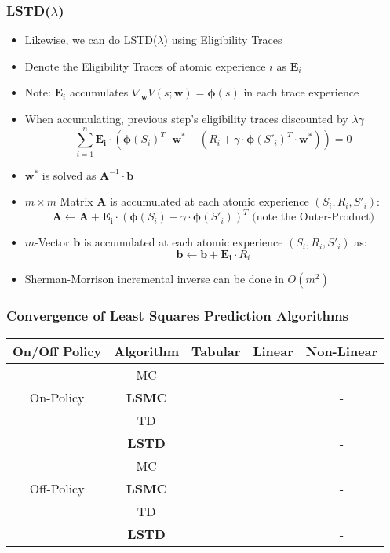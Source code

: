 \documentclass[handout]{beamer}
\newcommand{\cmark}{\ding{51}}%
\newcommand{\xmark}{\ding{55}}%
\begin{document}
\begin{frame}
\frametitle{LSTD($\lambda$)}
\pause
\begin{itemize}[<+->]
\item Likewise, we can do LSTD($\lambda$) using Eligibility Traces
\item Denote the Eligibility Traces of atomic experience $i$ as $\bm{E}_i$
\item Note: $\bm{E}_i$ accumulates $\nabla_{\bm{w}} V(s;\bm{w}) = \bm{\phi}(s)$ in each trace experience
\item When accumulating, previous step's eligibility traces discounted by $\lambda \gamma$
$$\sum_{i=1}^n \bm{E_i} \cdot (\bm{\phi}(S_i)^T \cdot \bm{w^*} - (R_i + \gamma \cdot \bm{\phi}(S'_i)^T \cdot \bm{w}^*)) = 0$$
\item $\bm{w}^*$ is solved as $\bm{A}^{-1} \cdot \bm{b}$
\item $m \times m$ Matrix $\bm{A}$ is accumulated at each atomic experience $(S_i, R_i, S'_i)$:
$$ \bm{A} \leftarrow \bm{A} + \bm{E_i} \cdot (\bm{\phi}(S_i) - \gamma \cdot \bm{\phi}(S'_i))^T \text{ (note the Outer-Product)}$$
\item $m$-Vector $\bm{b}$ is accumulated at each atomic experience $(S_i, R_i, S'_i)$ as:
$$\bm{b} \leftarrow \bm{b} + \bm{E_i} \cdot R_i$$
\item Sherman-Morrison incremental inverse can be done in $O(m^2)$
\end{itemize}
\end{frame}

\begin{frame}
\frametitle{Convergence of Least Squares Prediction Algorithms}
\pause
\begin{center}
      \begin{tabular}{ccccc}
      \hline
      On/Off Policy & Algorithm & Tabular & Linear & Non-Linear \\ \hline
      \multirow{3}{*}{On-Policy} & MC & \cmark & \cmark & \cmark \\
      & {\bf LSMC} & \cmark & \cmark & - \\
      & TD & \cmark & \cmark & \xmark \\ 
      & {\bf LSTD} & \cmark & \cmark & - \\ \hline
      \multirow{3}{*}{Off-Policy} & MC & \cmark & \cmark & \cmark \\
      & {\bf LSMC} & \cmark & \xmark & - \\
      & TD & \cmark & \xmark & \xmark \\
      & {\bf LSTD} & \cmark & \xmark & - \\ \hline
      \end{tabular}
\end{center}      
\end{frame}
\end{document}
